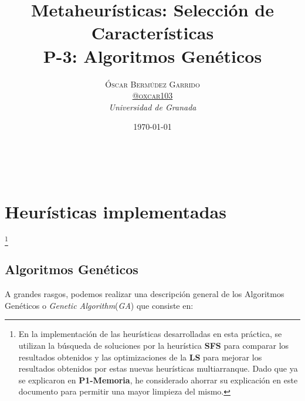 \documentclass[a4paper, 11pt]{article}
\title{\textbf{Metaheurísticas: Selección de Características}\\ %
P-3: Algoritmos Genéticos} %
\author{\textsc{Óscar Bermúdez Garrido\\
\href{http://www.github.com/oxcar103}{@oxcar103}} %
\\{\textit{Universidad de Granada}}} %
\date{\today} %
\makeatletter
\renewcommand{\maketitle}{
  \begin{flushright} %
  {\LARGE\@title} %
  
  \vspace{50pt} %
  
  {\large\@author} %
  \\\@date %
  \vspace{40pt} %
  \end{flushright}
}
\makeatother
\begin{document}
\maketitle %

\renewcommand{\abstractname}{Resumen} %



{\parskip=2pt
  \tableofcontents
}
\pagebreak

	
	
	
	\section{Heurísticas implementadas}\footnote{En la implementación de las heurísticas desarrolladas
	en esta práctica, se utilizan la búsqueda de soluciones por la heurística \textbf{SFS} para comparar
	los resultados obtenidos y las optimizaciones de la \textbf{LS} para mejorar los resultados obtenidos
	por estas nuevas heurísticas multiarranque. Dado que ya se explicaron en \textbf{P1-Memoria}, he
	considerado ahorrar su explicación en este documento para permitir una mayor limpieza del mismo.}
	
		\subsection{Algoritmos Genéticos}
			A grandes rasgos, podemos realizar una descripción general de los Algoritmos Genéticos o
			\textit{Genetic Algorithm}(\textit{GA}) que consiste en:
			
\end{document}
